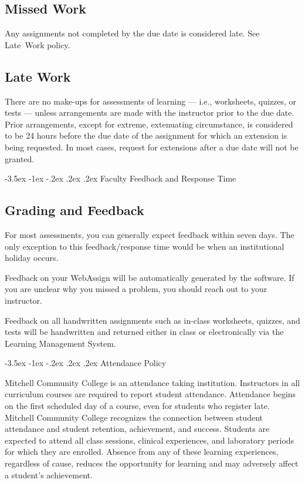 \documentclass{article}
\makeatletter
\renewcommand\section{\@startsection{section}{1}{0pt}%
  {-3.5ex \@plus -1ex \@minus -.2ex}%
  {.2ex \@plus.2ex}%
  {\normalfont\Large\bfseries}} %
\makeatother
\begin{document}
\subsection{Missed Work}

Any assignments not completed by the due date is considered late. See Late~Work policy.

\subsection{Late Work}

There are no make-ups for assessments of learning --- i.e., worksheets, quizzes, or tests --- unless arrangements are made with the instructor prior to the due date. Prior arrangements, except for extreme, extenuating circumstance, is considered to be 24 hours before the due date of the assignment for which an extension is being requested. In most cases, request for extensions after a due date will not be granted.

\section{Faculty Feedback and Response Time}

\subsection{Grading and Feedback}

For most assessments, you can generally expect feedback within seven days. The only exception to this feedback/response time would be when an institutional holiday occurs.

Feedback on your WebAssign will be automatically generated by the software. If you are unclear why you missed a problem, you should reach out to your instructor.

Feedback on all handwritten assignments such as in-class worksheets, quizzes, and tests will be handwritten and returned either in class or electronically via the Learning Management System.

\section{Attendance Policy}

Mitchell Community College is an attendance taking institution. Instructors in all curriculum courses are required to report student attendance. Attendance begins on the first scheduled day of a course, even for students who register late. Mitchell Community College recognizes the connection between student attendance and student retention, achievement, and success. Students are expected to attend all class sessions, clinical experiences, and laboratory periods for which they are enrolled. Absence from any of these learning experiences, regardless of cause, reduces the opportunity for learning and may adversely affect a student's achievement.
\end{document}
